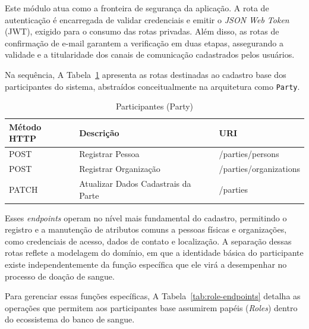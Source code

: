 Este módulo atua como a fronteira de segurança da aplicação. A rota de autenticação é encarregada de validar credenciais e emitir o \textit{JSON Web Token} (JWT), exigido para o consumo das rotas privadas. Além disso, as rotas de confirmação de e-mail garantem a verificação em duas etapas, assegurando a validade e a titularidade dos canais de comunicação cadastrados pelos usuários.

Na sequência, A Tabela~\ref{tab:party-endpoints} apresenta as rotas destinadas ao cadastro base dos participantes do sistema, abstraídos conceitualmente na arquitetura como \texttt{Party}.

\begin{table}[H]
  \centering
  \caption{Participantes (Party)}
  \label{tab:party-endpoints}
  \begin{tabularx}{\textwidth}{>{\raggedright\arraybackslash}p{2.5cm} >{\raggedright\arraybackslash}X >{\ttfamily\raggedright\arraybackslash}p{6cm}}
    \toprule
    \textbf{Método HTTP} & \textbf{Descrição} & \textbf{URI} \\
    \midrule
    POST & Registrar Pessoa & /parties/persons \\
    POST & Registrar Organização & /parties/organizations \\
    PATCH & Atualizar Dados Cadastrais da Parte & /parties \\
    \bottomrule
  \end{tabularx}
\end{table}

Esses \textit{endpoints} operam no nível mais fundamental do cadastro, permitindo o registro e a manutenção de atributos comuns a pessoas físicas e organizações, como credenciais de acesso, dados de contato e localização. A separação dessas rotas reflete a modelagem do domínio, em que a identidade básica do participante existe independentemente da função específica que ele virá a desempenhar no processo de doação de sangue.

Para gerenciar essas funções específicas, A Tabela~\ref{tab:role-endpoints} detalha as operações que permitem aos participantes base assumirem papéis (\textit{Roles}) dentro do ecossistema do banco de sangue.

